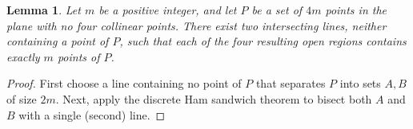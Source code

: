 \documentclass[11pt,a4paper]{amsart}
\newtheorem{lemma}[theorem]{Lemma}
\begin{document}
\begin{lemma}\label{quarters}
Let $m$ be a positive integer, and let $P$ be a set of $4m$ points in
the plane with no four collinear points. There exist two intersecting
lines, neither containing a point of $P$, such that each of the four
resulting open regions contains exactly $m$ points of $P$.
\end{lemma}
\begin{proof}
First choose a line containing no point of $P$ that separates $P$ into
sets $A,B$ of size $2m$.
Next, apply the discrete Ham sandwich theorem to bisect both $A$ and $B$ with a single (second) line.
\end{proof}

\newpage
\end{document}
